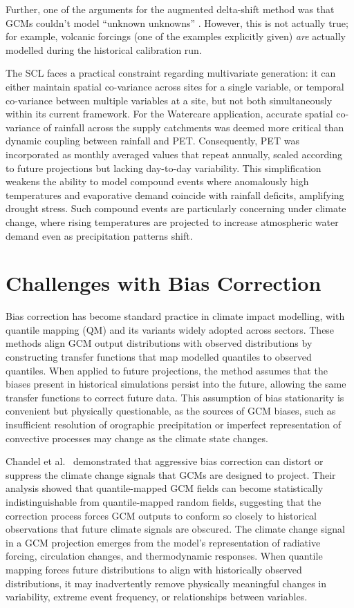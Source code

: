 Further, one of the arguments for the augmented delta-shift method was that GCMs couldn't model ``unknown 
unknowns'' \cite{tnt}. However, this is not actually true; for example, volcanic forcings (one of
the examples explicitly given) \textit{are} actually modelled during the historical calibration
run.

The SCL faces a practical constraint regarding multivariate generation: it can either maintain 
spatial co-variance across sites for a single variable, or temporal co-variance between 
multiple variables at a site, but not both simultaneously within its current framework. For the 
Watercare application, accurate spatial co-variance of rainfall across the supply catchments 
was deemed more critical than dynamic coupling between rainfall and PET. Consequently, PET was 
incorporated as monthly averaged values that repeat annually, scaled according to future 
projections but lacking day-to-day variability. This simplification weakens the ability to 
model compound events where anomalously high temperatures and evaporative demand coincide with 
rainfall deficits, amplifying drought stress. Such compound events are particularly concerning 
under climate change, where rising temperatures are projected to increase atmospheric water 
demand even as precipitation patterns shift.

\section{Challenges with Bias Correction}

Bias correction has become standard practice in climate impact modelling, with quantile 
mapping (QM) and its variants widely adopted across sectors. These methods align GCM output 
distributions with observed distributions by constructing transfer functions that map modelled 
quantiles to observed quantiles. When applied to future projections, the method assumes that 
the biases present in historical simulations persist into the future, allowing the same 
transfer functions to correct future data. This assumption of bias stationarity is convenient 
but physically questionable, as the sources of GCM biases, such as insufficient resolution of 
orographic precipitation or imperfect representation of convective processes may change as 
the climate state changes.

Chandel et al.~\cite{Chandel_2024} demonstrated that aggressive bias 
correction can distort or suppress the climate change signals that GCMs are designed to project. 
Their analysis showed that quantile-mapped GCM fields can become statistically 
indistinguishable from quantile-mapped random fields, suggesting that the correction process 
forces GCM outputs to conform so closely to historical observations that future climate signals 
are obscured. The climate change signal in a GCM projection emerges from the model's 
representation of radiative forcing, circulation changes, and thermodynamic responses. When 
quantile mapping forces future distributions to align with historically observed distributions, 
it may inadvertently remove physically meaningful changes in variability, extreme event 
frequency, or relationships between variables.

